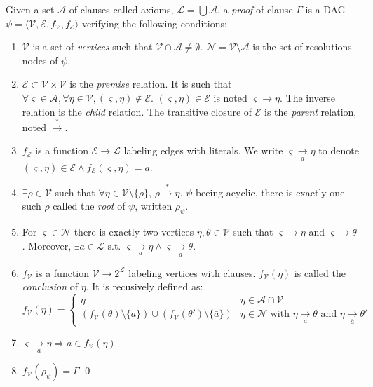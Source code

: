 \documentclass{llncs}
\newcommand{\dual}[1]{\ensuremath{\bar{#1}}}
\begin{document}
\begin{definition}[Proof] \label{def:proof}
Given a set $\mathcal{A}$ of clauses called axioms, $\mathcal{L} = \bigcup{\mathcal{A}}$, a
\emph{proof} of clause $\Gamma$ is a DAG $\psi = \langle \mathcal{V}, \mathcal{E}, f_\mathcal{V},
f_\mathcal{E} \rangle$ verifying the following conditions:
\begin{enumerate}%
  \item $\mathcal{V}$ is a set of \emph{vertices} such that
    $\mathcal{V} \cap \mathcal{A} \neq \emptyset$.
    $\mathcal{N} = \mathcal{V} \setminus \mathcal{A}$ is the set of resolutions nodes of $\psi$.
  \item $\mathcal{E} \subset \mathcal{V} \times \mathcal{V}$ is the \emph{premise} relation.
    It is such that $\forall \varsigma \in \mathcal{A}, \forall \eta \in \mathcal{V}, (\varsigma,
    \eta) \notin \mathcal{E}$. $(\varsigma, \eta) \in \mathcal{E}$ is noted $\varsigma \rightarrow
    \eta$. The inverse relation is the \emph{child} relation. The transitive closure of
    $\mathcal{E}$ is the \emph{parent} relation, noted $\xrightarrow{*}$.
  \item $f_\mathcal{E}$ is a function $\mathcal{E} \longrightarrow \mathcal{L}$ labeling edges with
    literals. We write $\varsigma \xrightarrow[a]{} \eta$ to denote
    $(\varsigma, \eta) \in \mathcal{E} \wedge f_\mathcal{E}(\varsigma, \eta) = a$.
  \item $\exists \rho \in \mathcal{V}$ such that $\forall \eta \in \mathcal{V} \setminus \{\rho\}$,
    $\rho \xrightarrow{*} \eta$. $\psi$ beeing acyclic, there is exactly one such $\rho$ called the
    \emph{root} of $\psi$, written $\rho_\psi$.
  \item For $\varsigma \in \mathcal{N}$ there is exactly two vertices $\eta, \theta \in \mathcal{V}$
    such that $\varsigma \rightarrow \eta$ and $\varsigma \rightarrow \theta$. Moreover,
    $\exists a \in \mathcal{L}$ s.t. $\varsigma \xrightarrow[a]{} \eta \wedge \varsigma
    \xrightarrow[\dual{a}]{} \theta$.
  \item $f_\mathcal{V}$ is a function $\mathcal{V} \longrightarrow 2^\mathcal{L}$ labeling vertices
    with clauses. $f_\mathcal{V}(\eta)$ is called the \emph{conclusion} of $\eta$. It is recusively
    defined as:
    \begin{equation*}
      f_\mathcal{V}(\eta) = \begin{cases}
        \eta & \eta \in \mathcal{A} \cap \mathcal{V} \\
        \left(f_\mathcal{V}(\theta) \setminus \{a\}\right) \cup
        \left(f_\mathcal{V}(\theta') \setminus \{\dual{a}\}\right) &
              \eta \in \mathcal{N} \text{ with } \eta \xrightarrow[a]{} \theta \text{ and }
                                               \eta \xrightarrow[\dual{a}]{} \theta'
      \end{cases}
    \end{equation*}
  \item $\varsigma \xrightarrow[a]{} \eta \Rightarrow a \in f_\mathcal{V}(\eta)$
  \item $f_\mathcal{V}(\rho_\psi) = \Gamma$
  \qed
\end{enumerate}
\end{definition}
\end{document}
